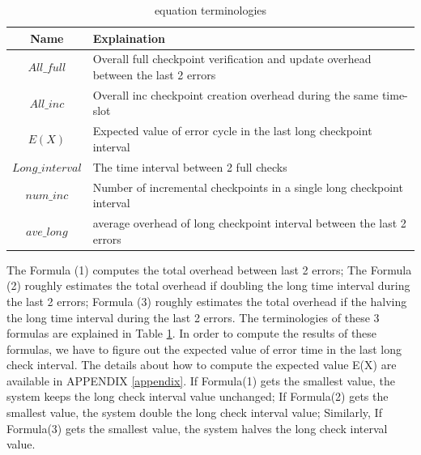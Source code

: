 \documentclass{sig-alternate}
\begin{document}
\begin{table}
\setlength{\abovecaptionskip}{-0.5pt}
\setlength{\belowcaptionskip}{-1pt}
\centering{}
\footnotesize
\captionsetup{justification=centering}
\caption{\label{tab:equation_expian}equation terminologies}

\begin{tabular}{|c|p{5cm}|}
\hline 
\textbf{Name} & \textbf{Explaination} \tabularnewline
\hline 
$All\_full $ & Overall full checkpoint verification and update overhead between the last 2 errors  \tabularnewline
\hline 
$All\_inc$ & Overall inc checkpoint creation overhead during the same time-slot \tabularnewline
\hline 
$E(X)$ & Expected value of error cycle in the last long checkpoint interval \tabularnewline
\hline 
$Long\_interval$ & The time interval between 2 full checks\tabularnewline
\hline 
$num\_inc$ & Number of incremental checkpoints in a single long checkpoint interval\tabularnewline
\hline 
$ave\_long$ & average overhead of long checkpoint interval between the last 2 errors\tabularnewline
\hline 

\end{tabular}
\vspace{-2mm}
\end{table}

The Formula (1) computes the total overhead between last 2 errors; The Formula (2) roughly estimates the total overhead if doubling the long time interval during the last 2 errors; Formula (3)  roughly estimates the total overhead if the halving the long time interval during the last 2 errors. The terminologies of these 3 formulas are explained in Table \ref{tab:equation_expian}. In order to compute the results of these formulas, we have to figure out the expected value of error time in the last long check interval. The details about how to compute the expected value E(X) are available in   APPENDIX \ref{appendix}. If Formula(1) gets the smallest value, the system keeps the long check interval value unchanged; If Formula(2) gets the smallest value, the system double the long check interval value; Similarly, If Formula(3) gets the smallest value, the system halves the long check interval value. 
\end{document}
